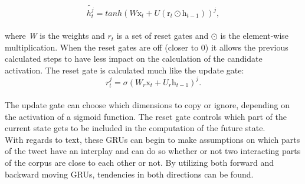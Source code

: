 \begin{equation} \label{eq:candidate}
\tilde{h_{t}^{j}} = tanh\left(W\mathrm{x}_{t}+U\left(\mathrm{r}_{t}\odot\mathrm{h}_{t-1}\right)\right)^{j},
\end{equation}\\

where \textit{W} is the weights and $r_{t}$ is a set of reset gates and $\odot$ is the element-wise multiplication. When the reset gates are off (closer to 0) it allows the previous calculated steps to have less impact on the calculation of the candidate activation. The reset gate is calculated much like the update gate:\\

\begin{equation}\label{eq:reset}
r_{t}^{j}=\sigma\left(W_{r}\mathrm{x}_{t}+U_{r}\mathrm{h}_{t-1}\right)^{j}.
\end{equation}\\

The update gate can choose which dimensions to copy or ignore, depending on the activation of a sigmoid function. The reset gate controls which part of the current state gets to be included in the computation of the future state.\\
With regards to text, these GRUs can begin to make assumptions on which parts of the tweet have an interplay and can do so whether or not two interacting parts of the corpus are close to each other or not. By utilizing both forward and backward moving GRUs, tendencies in both directions can be found.

